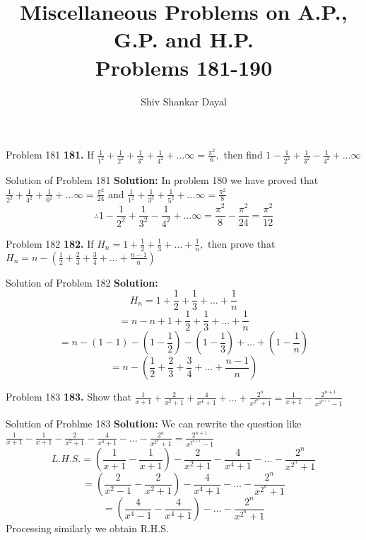 \documentclass[aspectratio=1610,8pt]{beamer}
\title{Miscellaneous Problems on A.P., G.P. and H.P.\\Problems 181-190}
\author[Shiv Shankar Dayal]{Shiv Shankar Dayal}
\begin{document}
\begin{frame}
  \titlepage
\end{frame}
\begin{frame}{Problem 181}
  \textbf{181.} If $\frac{1}{1^2} + \frac{1}{2^2} + \frac{1}{3^2} + \frac{1}{4^2} + \ldots \infty = \frac{\pi^2}{6},$ then find $1
  - \frac{1}{2^2} + \frac{1}{3^2} - \frac{1}{4^2} + \ldots \infty$
\end{frame}
\begin{frame}{Solution of Problem 181}
  \textbf{Solution:} In problem 180 we have proved that $\frac{1}{2^2} + \frac{1}{4^2} + \frac{1}{6^2} + \ldots \infty =
  \frac{\pi^2}{24}$ and $\frac{1}{1^2} + \frac{1}{3^3} + \frac{1}{5^2} + \ldots \infty = \frac{\pi^2}{8}$
  \linebreak\linebreak
  $$\therefore 1- \frac{1}{2^2} + \frac{1}{3^2} - \frac{1}{4^2} + \ldots \infty = \frac{\pi^2}{8} - \frac{\pi^2}{24} =
  \frac{\pi^2}{12}$$
\end{frame}
\begin{frame}{Problem 182}
  \textbf{182.} If $H_n = 1 + \frac{1}{2} + \frac{1}{3} + \ldots + \frac{1}{n},$ then prove that $H_n = n - \left(\frac{1}{2} +
  \frac{2}{3} + \frac{3}{4} + \ldots + \frac{n - 1}{n}\right)$
\end{frame}
\begin{frame}{Solution of Problem 182}
  \textbf{Solution:} $$H_n = 1 + \frac{1}{2} + \frac{1}{3} + \ldots + \frac{1}{n}$$
  $$= n - n + 1 + \frac{1}{2} + \frac{1}{3} + \ldots + \frac{1}{n}$$
  $$= n -\left(1 - 1\right) - \left(1 - \frac{1}{2}\right) - \left(1 - \frac{1}{3}\right) + \ldots + \left(1 - \frac{1}{n}\right)$$
  $$= n - \left(\frac{1}{2} + \frac{2}{3} + \frac{3}{4} + \ldots + \frac{n - 1}{n}\right)$$
\end{frame}
\begin{frame}{Problem 183}
  \textbf{183.} Show that $\frac{1}{x + 1} + \frac{2}{x^2 + 1} + \frac{4}{x^4 + 1} + \ldots + \frac{2^n}{x^{2^{n}} + 1} =
  \frac{1}{x + 1} - \frac{2^{n + 1}}{x^{2^{n + 1}} -1}$
\end{frame}
\begin{frame}{Solution of Problme 183}
  \textbf{Solution:} We can rewrite the question like $\frac{1}{x + 1} - \frac{1}{x + 1} - \frac{2}{x^2 + 1} - \frac{4}{x^4 + 1} -
  \ldots - \frac{2^n}{x^{2^{n}} + 1} = \frac{2^{n + 1}}{x^{2^{n + 1}} - 1}$
  $$L.H.S. = \left(\frac{1}{x + 1} - \frac{1}{x + 1}\right) - \frac{2}{x^2 + 1} - \frac{4}{x^4 + 1} - \ldots - \frac{2^n}{x^{2^{n}} + 1}$$
  $$= \left(\frac{2}{x^2 - 1} - \frac{2}{x^2 + 1}\right) - \frac{4}{x^4 + 1} - \ldots - \frac{2^n}{x^{2^{n}} + 1}$$
  $$= \left(\frac{4}{x^4 - 1} - \frac{4}{x^4 + 1}\right) - \ldots - \frac{2^n}{x^{2^{n}} + 1}$$
  Processing similarly we obtain R.H.S.
\end{frame}
\end{document}
